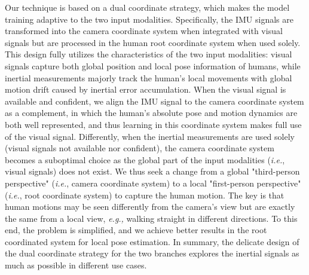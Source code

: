 \documentclass[sigconf,nonacm=true]{acmart}
\begin{document}
Our technique is based on a dual coordinate strategy, which makes the model training adaptive to the two input modalities.
Specifically, the IMU signals are transformed into the camera coordinate system when integrated with visual signals but are processed in the human root coordinate system when used solely.
This design fully utilizes the characteristics of the two input modalities: visual signals capture both global position and local pose information of humans, while inertial measurements majorly track the human's local movements with global motion drift caused by inertial error accumulation. 
When the visual signal is available and confident, we align the IMU signal to the camera coordinate system as a complement, in which the human's absolute pose and motion dynamics are both well represented, and thus learning in this coordinate system makes full use of the visual signal.
Differently, when the inertial measurements are used solely (visual signals not available nor confident), the camera coordinate system becomes a suboptimal choice as the global part of the input modalities (\textit{i.e.}, visual signals) does not exist.
We thus seek a change from a global "third-person perspective" (\textit{i.e.}, camera coordinate system) to a local "first-person perspective" (\textit{i.e.}, root coordinate system) to capture the human motion.
The key is that human motions may be seen differently from the camera's view but are exactly the same from a local view, \textit{e.g.,} walking straight in different directions.
To this end, the problem is simplified, and we achieve better results in the root coordinated system for local pose estimation.
In summary, the delicate design of the dual coordinate strategy for the two branches explores the inertial signals as much as possible in different use cases.
\end{document}
